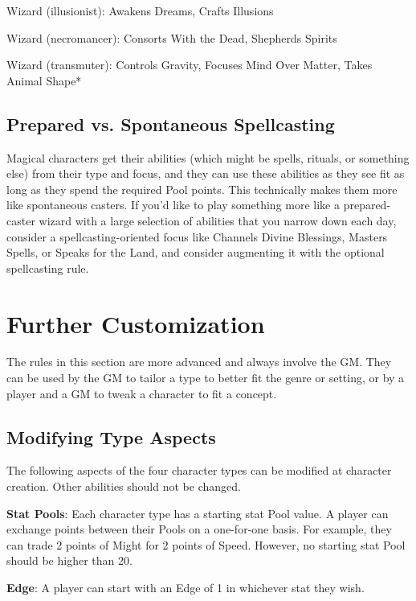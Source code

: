 Wizard (illusionist): Awakens Dreams, Crafts Illusions 

Wizard (necromancer): Consorts With the Dead, Shepherds Spirits 

Wizard (transmuter): Controls Gravity, Focuses Mind Over Matter, Takes Animal Shape*

\section{Prepared vs. Spontaneous Spellcasting}

Magical characters get their abilities (which might be spells, rituals, or something else) from their type and focus, and they can use these abilities as they see fit as long as they spend the required Pool points. This technically makes them more like spontaneous casters. If you’d like to play something more like a prepared-caster wizard with a large selection of abilities that you narrow down each day, consider a spellcasting-oriented focus like Channels Divine Blessings, Masters Spells, or Speaks for the Land, and consider augmenting it with the optional spellcasting rule.

\chapter{Further Customization}
The rules in this section are more advanced and always involve the GM. They can be used by the GM to tailor a type to better fit the genre or setting, or by a player and a GM to tweak a character to fit a concept.

\section{Modifying Type Aspects}

The following aspects of the four character types can be modified at character creation. Other abilities should not be changed.

\textbf{Stat Pools}: Each character type has a starting stat Pool value. A player can exchange points between their Pools on a one-for-one basis. For example, they can trade 2 points of Might for 2 points of Speed. However, no starting stat Pool should be higher than 20.

\textbf{Edge}: A player can start with an Edge of 1 in whichever stat they wish.

